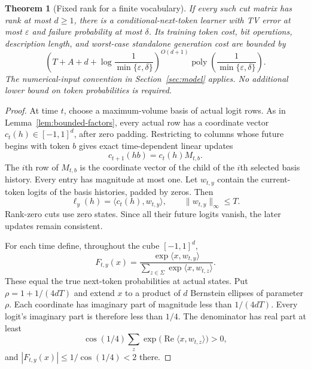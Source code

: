\documentclass[11pt]{article}
\newcommand{\poly}{\operatorname{poly}}
\newtheorem{theorem}{Theorem}
\theoremstyle{definition}
\theoremstyle{remark}
\begin{document}
\begin{theorem}[Fixed rank for a finite vocabulary]\label{thm:alphabet}
If every such cut matrix has rank at most $d\ge1$, there is a conditional-next-token learner with TV error at most $\varepsilon$ and failure probability at most $\delta$. Its training token cost, bit operations, description length, and worst-case standalone generation cost are bounded by
\[
\left(T+A+d+\log\frac1{\min\{\varepsilon,\delta\}}\right)^{O(d+1)}
\poly\!\left(\frac1{\min\{\varepsilon,\delta\}}\right).
\]
The numerical-input convention in Section~\ref{sec:model} applies. No additional lower bound on token probabilities is required.
\end{theorem}
\begin{proof}
At time $t$, choose a maximum-volume basis of actual logit rows. As in Lemma~\ref{lem:bounded-factors}, every actual row has a coordinate vector $c_t(h)\in[-1,1]^d$, after zero padding. Restricting to columns whose future begins with token $b$ gives exact time-dependent linear updates
\[
c_{t+1}(hb)=c_t(h)M_{t,b}.
\]
The $i$th row of $M_{t,b}$ is the coordinate vector of the child of the $i$th selected basis history. Every entry has magnitude at most one. Let $w_{t,y}$ contain the current-token logits of the basis histories, padded by zeros. Then
\[
\ell_y(h)=\langle c_t(h),w_{t,y}\rangle,\qquad
\|w_{t,y}\|_\infty\le T.
\]
Rank-zero cuts use zero states. Since all their future logits vanish, the later updates remain consistent.

For each time define, throughout the cube $[-1,1]^d$,
\[
F_{t,y}(x)=
\frac{\exp\langle x,w_{t,y}\rangle}
{\sum_{z\in\Sigma}\exp\langle x,w_{t,z}\rangle}.
\]
These equal the true next-token probabilities at actual states. Put
$\rho=1+1/(4dT)$ and extend $x$ to a product of $d$ Bernstein ellipses of parameter $\rho$. Each coordinate has imaginary part of magnitude less than $1/(4dT)$. Every logit's imaginary part is therefore less than $1/4$. The denominator has real part at least
\[
\cos(1/4)\sum_z\exp\bigl(\operatorname{Re}\langle x,w_{t,z}\rangle\bigr)>0,
\]
and $|F_{t,y}(x)|\le1/\cos(1/4)<2$ there.


\end{proof}
\end{document}

